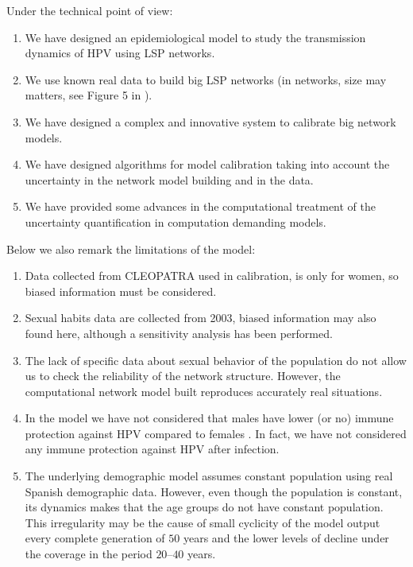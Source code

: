 Under the technical point of view:
\begin{enumerate}
	\item We have designed an epidemiological model to study the transmission dynamics of HPV using LSP networks.
	\item We use known real data to build big LSP networks (in networks, size may matters, see Figure 5 in \cite{villanueva2013epidemic}).
	\item We have designed a complex and innovative system to calibrate big network models.
	\item We have designed algorithms for model calibration taking into account the uncertainty in the network model building and in the data. 
	\item We have provided some advances in the computational treatment of the uncertainty quantification in computation demanding models.
\end{enumerate}

Below we also remark the limitations of the model:
\begin{enumerate}
	\item Data collected from CLEOPATRA used in calibration, is only for women, so biased information must be considered.
	\item Sexual habits data are collected from 2003, biased information may also found here, although a sensitivity analysis has been performed.
	\item The lack of specific data about sexual behavior of the population do not allow us to check the reliability of the network structure. However, the computational network model built reproduces accurately real situations.
	\item In the model we have not considered that males have lower (or no) immune protection against HPV compared to females \cite{Beachler2018}. In fact, we have not considered any immune protection against HPV after infection.
	\item The underlying demographic model assumes constant population using real Spanish demographic data. However, even though the population is constant, its dynamics makes that the age groups do not have constant population. This irregularity may be the cause of small cyclicity of the model output every complete generation of $5$0 years and the lower levels of decline under the coverage in the period $20–40$ years.
\end{enumerate}
